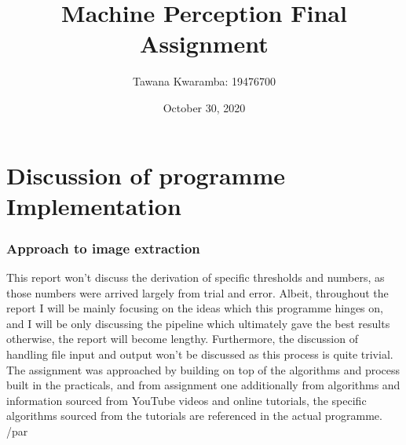 \documentclass[
	12pt, %
]{fphw}
\title{Machine Perception Final Assignment} %
\author{Tawana Kwaramba: 19476700} %
\date{October 30, 2020} %
\institute{Curtin University \\ Faculty of Science and Engineering: School of Civil and Mechanical Engineering} %
\begin{document}
\maketitle
\newpage


\newpage
\begin{spacing}{0.1}
\newpage
\newpage
\tableofcontents
\newpage
\listoffigures
\newpage
\listoftables
\newpage
\end{spacing}

\part{Discussion of programme Implementation}
\newpage



\newpage
\section{Approach to image extraction}
This report won’t discuss the derivation of specific thresholds and numbers, as those numbers were arrived largely from trial and error. Albeit, throughout the report I will be mainly focusing on the ideas which this programme hinges on, and I will be only discussing the pipeline which ultimately gave the best results otherwise, the report will become lengthy. Furthermore, the discussion of handling file input and output won’t be discussed as this process is quite trivial. The assignment was approached by building on top of the algorithms and process built in the practicals, and from assignment one additionally from algorithms and information sourced from YouTube videos and online tutorials, the specific algorithms sourced from the tutorials are referenced in the actual programme. /par
\end{document}
